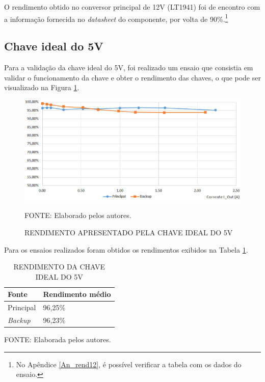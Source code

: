 \documentclass[
	12pt,				%
	openright,			%
	oneside,			%
	a4paper,			%
	english,			%
	french,				%
	spanish,			%
	brazil,				%
	oldfontcommands
	]{abntex2}
\begin{document}
	O rendimento obtido no conversor principal de 12V (LT1941) foi de encontro com a informação fornecida no \textit{datasheet} do componente, por volta de 90\%.\footnote{No Apêndice \ref{An_rend12}, é possível verificar a tabela com os dados do ensaio.} 
	
	\subsection[Chave ideal do 5V]{Chave ideal do 5V}

	Para a validação da chave ideal do 5V, foi realizado um ensaio que consistia em validar o funcionamento da chave e obter o rendimento das chaves, o que pode ser visualizado na Figura \ref{Fig_rendch5}.
	
	\begin{figure}[th]
		\caption{RENDIMENTO APRESENTADO PELA CHAVE IDEAL DO 5V}
		\label{Fig_rendch5}
		\centering
		\includegraphics[width=0.8\linewidth]{./figs/rendch5}
			
		\begin{small}
			FONTE: Elaborado pelos autores.
		\end{small}		
	\end{figure}

	Para os ensaios realizados foram obtidos os rendimentos exibidos na Tabela \ref{Tab_rendch5}.
	
	\begin{table}[th]
	\caption{RENDIMENTO DA CHAVE IDEAL DO 5V}
	\label{Tab_rendch5}
	\centering
		\begin{tabular}{p{2cm}|p{4cm}}
			\textbf{Fonte} & \textbf{Rendimento médio}\\
			\hline
			Principal & 96,25\%\\
			\textit{Backup} & 96,23\%\\
		\end{tabular}	
	
	\begin{small}
	\vspace{3pt}
		FONTE: Elaborada pelos autores.
	\end{small}
	\end{table}
\end{document}
